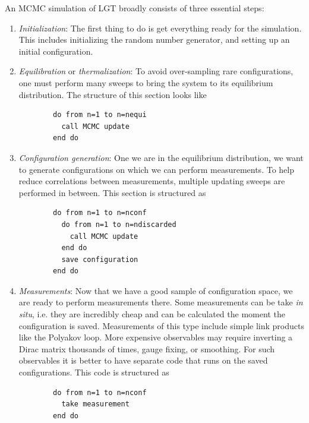 An MCMC simulation of LGT broadly consists of three essential steps:
\begin{enumerate}
  \item {\it Initialization}: The first thing to do is get everything ready for
        the simulation. This includes initializing the random number generator,
        and setting up an initial configuration.
  \item {\it Equilibration} or {\it thermalization}:
        To avoid over-sampling rare configurations,
        one must perform many sweeps to bring the system to its equilibrium 
        distribution. The structure of this section looks like 
        \begin{verbatim}
        do from n=1 to n=nequi 
          call MCMC update
        end do
        \end{verbatim}
  \item {\it Configuration generation}: One we are in the equilibrium
        distribution, we want to generate configurations on which we can
        perform measurements. To help reduce correlations between
        measurements, multiple updating sweeps are performed in between.
        This section is structured as
        \begin{verbatim}
        do from n=1 to n=nconf
          do from n=1 to n=ndiscarded
            call MCMC update
          end do
          save configuration 
        end do
        \end{verbatim}
  \item {\it Measurements}: Now that we have a good sample of configuration
        space, we are ready to perform measurements there. Some measurements
        can be take {\it in situ}, i.e. they are incredibly cheap and can be
        calculated the moment the configuration is saved. Measurements of this
        type include simple link products like the Polyakov loop. More expensive
        observables may require inverting a Dirac matrix thousands of times, 
        gauge fixing, or smoothing. For such observables it is better to
        have separate code that runs on the saved configurations. This
        code is structured as
        \begin{verbatim}
        do from n=1 to n=nconf
          take measurement 
        end do
        \end{verbatim}
\end{enumerate}

